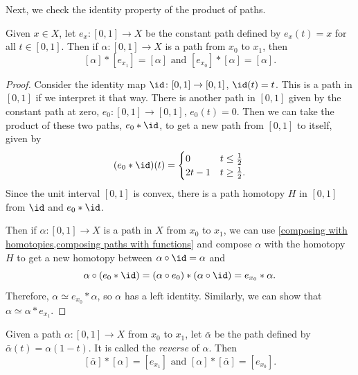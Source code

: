 \documentclass[noname]{notes}
\begin{document}
Next, we check the identity property of the product of paths. 

\begin{proposition}
\label{identity}
	Given $x \in X$, let $e_x \colon [0,1] \to X$ be the constant path defined by $e_x(t) = x$ for all $t \in [0,1]$. Then if $\alpha \colon [0,1] \to X$ is a path from $x_0$ to $x_1$, then 
		\[
			[\alpha] * [e_{x_1}] = [\alpha] \text{ and } [e_{x_0}] * [\alpha] = [\alpha]. 
		\]
\end{proposition}

\begin{proof}
	Consider the identity map $\id \colon [0,1] \to [0,1]$, $\id(t) = t$. This is a path in $[0,1]$ if we interpret it that way. There is another path in $[0,1]$ given by the constant path at zero, $e_0 \colon [0,1] \to [0,1]$, $e_0(t) = 0$. Then we can take the product of these two paths, $e_0 * \id$, to get a new path from $[0,1]$ to itself, given by 
	\[
		(e_0 * \id)(t) = \begin{cases}
			0 & t \leq \frac 1 2\\
			2t - 1 & t \geq \frac 1 2.
		\end{cases}
	\]
	Since the unit interval $[0,1]$ is convex, there is a path homotopy $H$ in $[0,1]$ from $\id$ and $e_0 * \id$. 
	
	Then if $\alpha \colon [0,1] \to X$ is a path in $X$ from $x_0$ to $x_1$, we can use \cref{composing with homotopies,composing paths with functions} and compose $\alpha$ with the homotopy $H$ to get a new homotopy between $\alpha \circ \id = \alpha$ and 
	\[
		\alpha \circ (e_0 * \id) = (\alpha \circ e_0) * (\alpha \circ \id) = e_{x_0} * \alpha.
	\]
	Therefore, $\alpha \simeq e_{x_0} * \alpha$, so $\alpha$ has a left identity. Similarly, we can show that $\alpha \simeq \alpha * e_{x_1}$. 
\end{proof}

\begin{proposition}
\label{inverse}
	Given a path $\alpha \colon [0,1] \to X$ from $x_0$ to $x_1$, let $\bar \alpha$ be the path defined by $\bar \alpha(t) = \alpha(1-t)$. It is called the \textit{reverse} of $\alpha$. Then 
		\[
			[\bar \alpha] * [\alpha] = [e_{x_1}] \text{ and } [\alpha]*[\bar \alpha] = [e_{x_0}].
		\]
\end{proposition}
\end{document}
